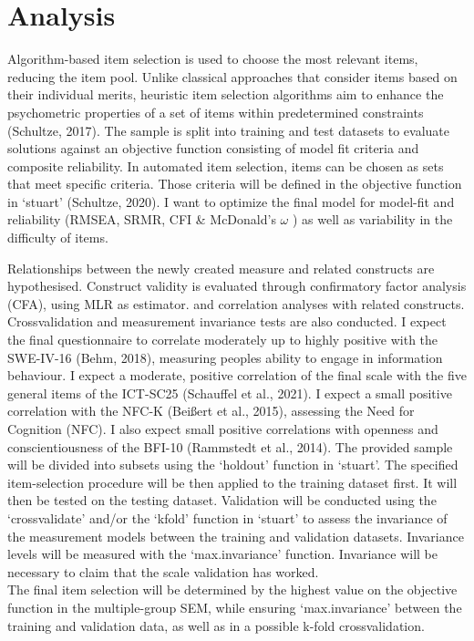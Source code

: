 \documentclass[
  12pt,
  a4paper,
  twoside]{article}
\begin{document}
\section{Analysis}\label{analysis}

Algorithm-based item selection is used to choose the most relevant items, reducing the item pool. Unlike classical approaches that consider items based on their individual merits, heuristic item selection algorithms aim to enhance the psychometric properties of a set of items within predetermined constraints (Schultze, 2017). The sample is split into training and test datasets to evaluate solutions against an objective function consisting of model fit criteria and composite reliability. In automated item selection, items can be chosen as sets that meet specific criteria. Those criteria will be defined in the objective function in `stuart' (Schultze, 2020). I want to optimize the final model for model-fit and reliability (RMSEA, SRMR, CFI \& McDonald's \(\omega\) ) as well as variability in the difficulty of items.

Relationships between the newly created measure and related constructs are hypothesised. Construct validity is evaluated through confirmatory factor analysis (CFA), using MLR as estimator. and correlation analyses with related constructs. Crossvalidation and measurement invariance tests are also conducted.
I expect the final questionnaire to correlate moderately up to highly positive with the SWE-IV-16 (Behm, 2018), measuring peoples ability to engage in information behaviour. I expect a moderate, positive correlation of the final scale with the five general items of the ICT-SC25 (Schauffel et al., 2021). I expect a small positive correlation with the NFC-K (Beißert et al., 2015), assessing the Need for Cognition (NFC). I also expect small positive correlations with openness and conscientiousness of the BFI-10 (Rammstedt et al., 2014).
The provided sample will be divided into subsets using the `holdout' function in `stuart'. The specified item-selection procedure will be then applied to the training dataset first. It will then be tested on the testing dataset.
Validation will be conducted using the `crossvalidate' and/or the `kfold' function in `stuart' to assess the invariance of the measurement models between the training and validation datasets. Invariance levels will be measured with the `max.invariance' function. Invariance will be necessary to claim that the scale validation has worked.\\
The final item selection will be determined by the highest value on the objective function in the multiple-group SEM, while ensuring `max.invariance' between the training and validation data, as well as in a possible k-fold crossvalidation.
\end{document}
